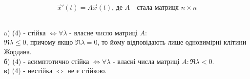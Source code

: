 \documentclass[14pt,a4paper]{scrartcl}
\theoremstyle{definition}
\theoremstyle{definition}
\theoremstyle{definition}
\begin{document}
\begin{equation}
\overrightarrow{x} ' (t) = A \overrightarrow{x} (t) \text{, де $A$ - стала матриця $n \times n$}
\end{equation}
\begin{boxteo} \quad \\
a) (4) - стійка $ \Longleftrightarrow  \forall \lambda $ - власне число матриці $A$: \\
$\Re \lambda \leq 0$, причому якщо $ \Re \lambda = 0$, то йому відповідають лише одновимірні клітини Жордана. \\
б) (4) - асимптотично стійка $ \Longleftrightarrow \forall \lambda $ - власні числа матриці $A: \Re \lambda < 0 $.\\
в) (4) - нестійка $ \Longleftrightarrow $ не є стійкою.
\end{boxteo}
\end{document}
